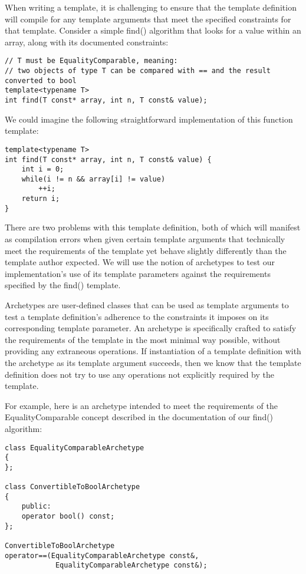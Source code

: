 When writing a template, it is challenging to ensure that the template definition will compile for any template arguments that meet the specified constraints for that template. Consider a simple find() algorithm that looks for a value within an array, along with its documented constraints:

\begin{lstlisting}[style=styleCXX]
// T must be EqualityComparable, meaning:
// two objects of type T can be compared with == and the result converted to bool
template<typename T>
int find(T const* array, int n, T const& value);
\end{lstlisting}

We could imagine the following straightforward implementation of this function template:

\begin{lstlisting}[style=styleCXX]
template<typename T>
int find(T const* array, int n, T const& value) {
	int i = 0;
	while(i != n && array[i] != value)
		++i;
	return i;
}
\end{lstlisting}

There are two problems with this template definition, both of which will manifest as compilation errors when given certain template arguments that technically meet the requirements of the template yet behave slightly differently than the template author expected. We will use the notion of archetypes to test our implementation’s use of its template parameters against the requirements specified by the find() template.

Archetypes are user-defined classes that can be used as template arguments to test a template definition’s adherence to the constraints it imposes on its corresponding template parameter. An archetype is specifically crafted to satisfy the requirements of the template in the most minimal way possible, without providing any extraneous operations. If instantiation of a template definition with the archetype as its template argument succeeds, then we know that the template definition does not try to use any operations not explicitly required by the template.

For example, here is an archetype intended to meet the requirements of the EqualityComparable concept described in the documentation of our find() algorithm:

\begin{lstlisting}[style=styleCXX]
class EqualityComparableArchetype
{
};

class ConvertibleToBoolArchetype
{
	public:
	operator bool() const;
};

ConvertibleToBoolArchetype
operator==(EqualityComparableArchetype const&,
			EqualityComparableArchetype const&);
\end{lstlisting}


